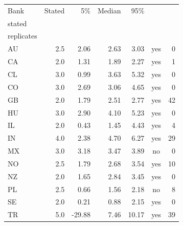 \begin{tabular}{lrrrrcr}\toprule
Bank & Stated & 5\% & Median & 95\% & \hd{Covers\\stated} & \hd{Degenerate\\replicates} \\\midrule
AU & 2.5 & 2.06 & 2.63 & 3.03 & yes & 0\\
CA & 2.0 & 1.31 & 1.89 & 2.27 & yes & 1\\
CL & 3.0 & 0.99 & 3.63 & 5.32 & yes & 0\\
CO & 3.0 & 2.69 & 3.06 & 4.65 & yes & 0\\
GB & 2.0 & 1.79 & 2.51 & 2.77 & yes & 42\\
HU & 3.0 & 2.90 & 4.10 & 5.23 & yes & 0\\
IL & 2.0 & 0.43 & 1.45 & 4.43 & yes & 4\\
IN & 4.0 & 2.38 & 4.70 & 6.27 & yes & 29\\
MX & 3.0 & 3.18 & 3.47 & 3.89 & no & 0\\
NO & 2.5 & 1.79 & 2.68 & 3.54 & yes & 10\\
NZ & 2.0 & 1.65 & 2.84 & 3.45 & yes & 0\\
PL & 2.5 & 0.66 & 1.56 & 2.18 & no & 8\\
SE & 2.0 & 0.21 & 0.88 & 2.15 & yes & 0\\
TR & 5.0 & -29.88 & 7.46 & 10.17 & yes & 39\\
\bottomrule\end{tabular}
